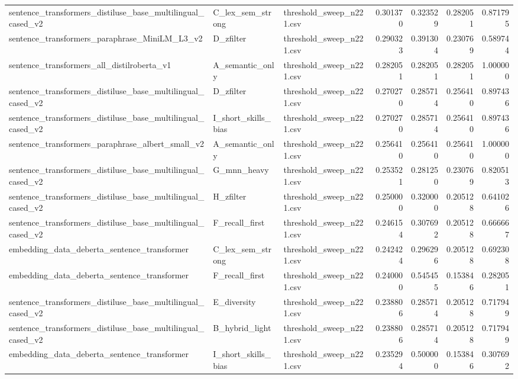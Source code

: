 \begin{table}[!ht]
\begin{tabular}{lllrrrr}
sentence\_transformers\_distiluse\_base\_multilingual\_cased\_v2 & C\_lex\_sem\_strong & threshold\_sweep\_n221.csv & 0.301370 & 0.323529 & 0.282051 & 0.871795 \\
sentence\_transformers\_paraphrase\_MiniLM\_L3\_v2 & D\_zfilter & threshold\_sweep\_n221.csv & 0.290323 & 0.391304 & 0.230769 & 0.589744 \\
sentence\_transformers\_all\_distilroberta\_v1 & A\_semantic\_only & threshold\_sweep\_n221.csv & 0.282051 & 0.282051 & 0.282051 & 1.000000 \\
sentence\_transformers\_distiluse\_base\_multilingual\_cased\_v2 & D\_zfilter & threshold\_sweep\_n221.csv & 0.270270 & 0.285714 & 0.256410 & 0.897436 \\
sentence\_transformers\_distiluse\_base\_multilingual\_cased\_v2 & I\_short\_skills\_bias & threshold\_sweep\_n221.csv & 0.270270 & 0.285714 & 0.256410 & 0.897436 \\
sentence\_transformers\_paraphrase\_albert\_small\_v2 & A\_semantic\_only & threshold\_sweep\_n221.csv & 0.256410 & 0.256410 & 0.256410 & 1.000000 \\
sentence\_transformers\_distiluse\_base\_multilingual\_cased\_v2 & G\_mnn\_heavy & threshold\_sweep\_n221.csv & 0.253521 & 0.281250 & 0.230769 & 0.820513 \\
sentence\_transformers\_distiluse\_base\_multilingual\_cased\_v2 & H\_zfilter & threshold\_sweep\_n221.csv & 0.250000 & 0.320000 & 0.205128 & 0.641026 \\
sentence\_transformers\_distiluse\_base\_multilingual\_cased\_v2 & F\_recall\_first & threshold\_sweep\_n221.csv & 0.246154 & 0.307692 & 0.205128 & 0.666667 \\
embedding\_data\_deberta\_sentence\_transformer & C\_lex\_sem\_strong & threshold\_sweep\_n221.csv & 0.242424 & 0.296296 & 0.205128 & 0.692308 \\
embedding\_data\_deberta\_sentence\_transformer & F\_recall\_first & threshold\_sweep\_n221.csv & 0.240000 & 0.545455 & 0.153846 & 0.282051 \\
sentence\_transformers\_distiluse\_base\_multilingual\_cased\_v2 & E\_diversity & threshold\_sweep\_n221.csv & 0.238806 & 0.285714 & 0.205128 & 0.717949 \\
sentence\_transformers\_distiluse\_base\_multilingual\_cased\_v2 & B\_hybrid\_light & threshold\_sweep\_n221.csv & 0.238806 & 0.285714 & 0.205128 & 0.717949 \\
embedding\_data\_deberta\_sentence\_transformer & I\_short\_skills\_bias & threshold\_sweep\_n221.csv & 0.235294 & 0.500000 & 0.153846 & 0.307692 \\

\end{tabular}
\end{table}
